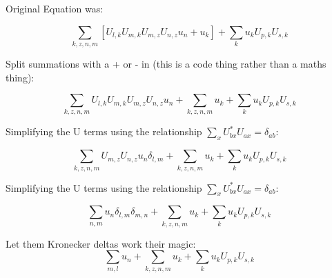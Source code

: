 \documentclass[12pt,a4paper]{article}
\begin{document}
Original Equation was:

\begin{dmath*}
\sum\limits_{k,z,n,m} \left[ U_{l,k} U_{m,k}U_{m,z}U_{n,z} u_{n}+ u_{k}\right]+
\sum\limits_{k}   u_{k} U_{p,k}U_{s,k}
\end{dmath*}

Split summations with a + or - in (this is a code thing rather than a maths thing):

\begin{dmath*}
\sum\limits_{k,z,n,m}  U_{l,k} U_{m,k}U_{m,z}U_{n,z} u_{n}+
\sum\limits_{k,z,n,m}   u_{k} +
\sum\limits_{k}   u_{k} U_{p,k}U_{s,k}
\end{dmath*}

Simplifying the U terms using the relationship $\sum\limits_{x}U^{*}_{bx}U_{ax} = \delta_{ab}$:

\begin{dmath*}
\sum\limits_{k,z,n,m}  U_{m,z} U_{n,z} u_{n}\delta_{l,m}+
\sum\limits_{k,z,n,m}   u_{k} +
\sum\limits_{k}   u_{k} U_{p,k}U_{s,k}
\end{dmath*}

Simplifying the U terms using the relationship $\sum\limits_{x}U^{*}_{bx}U_{ax} = \delta_{ab}$:

\begin{dmath*}
\sum\limits_{n,m}   u_{n} \delta_{l,m}\delta_{m,n}+
\sum\limits_{k,z,n,m}   u_{k} +
\sum\limits_{k}   u_{k} U_{p,k}U_{s,k}
\end{dmath*}

Let them Kronecker deltas work their magic: \begin{dmath*}
\sum\limits_{m,l}   u_{n} +
\sum\limits_{k,z,n,m}   u_{k} +
\sum\limits_{k}   u_{k} U_{p,k}U_{s,k}
\end{dmath*}
\end{document}
